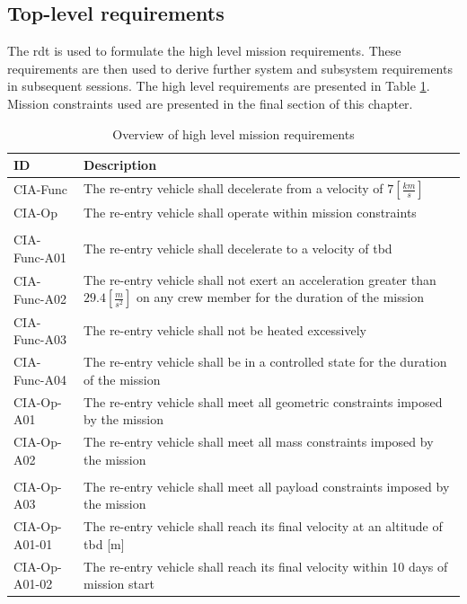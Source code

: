 \subsection{Top-level requirements}
The \gls{rdt} is used to formulate the high level mission requirements. These requirements are then used to derive further system and subsystem requirements in subsequent sessions. The high level requirements are presented in Table \ref{tab:toplevelreq}. Mission constraints used are presented in the final section of this chapter.

\begin{table}[H]
	\caption{Overview of high level mission requirements} \label{tab:toplevelreq}
	\begin{tabular}{|p{}|p{}|}
    \hline
    ID          & Description                                                                                                      \\ \hline \hline
    CIA-Func & The re-entry vehicle shall decelerate from a velocity of $7 [\frac{km}{s}]$ \\ \hline
    CIA-Op & The re-entry vehicle shall operate within mission constraints                                               \\ \hline
& \\ \hline
    CIA-Func-A01 & The re-entry vehicle shall decelerate to a velocity of \gls{tbd}     \\ \hline
    CIA-Func-A02 & The re-entry vehicle shall not exert an acceleration greater than $29.4 [\frac{m}{s^2}]$ on any crew member for the duration of the mission			\\ \hline
    CIA-Func-A03 & The re-entry vehicle shall not be heated excessively  \\ \hline
    CIA-Func-A04 & The re-entry vehicle shall be in a controlled state for the duration of the mission                            \\ \hline
    CIA-Op-A01 & The re-entry vehicle shall meet all geometric constraints imposed by the mission                           \\ \hline
    CIA-Op-A02 & The re-entry vehicle shall meet all mass constraints imposed by the mission                                      \\ \hline
& \\ \hline
	CIA-Op-A03 & The re-entry vehicle shall meet all payload constraints imposed by the mission \\ \hline
	CIA-Op-A01-01 & The re-entry vehicle shall reach its final velocity at an altitude of \gls{tbd} [m] \\ \hline
	CIA-Op-A01-02 & The re-entry vehicle shall reach its final velocity within 10 days of mission start \\ \hline
    \end{tabular}
\end{table}










